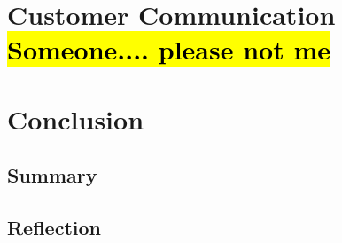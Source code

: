 \documentclass[10pt,a4paper]{article}
\begin{document}
\section{Customer Communication \hl{Someone.... please not me}}
\label{sec:customer_comms}

\section{Conclusion}
\label{sec:conclusion}


\subsection{Summary}
\label{sec:summary}


\subsection{Reflection}
\label{sec:reflection}



\end{document}
